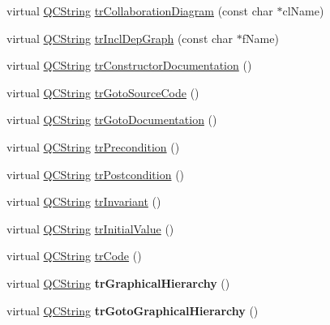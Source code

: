 \begin{DoxyCompactItemize}
\item 
virtual \hyperlink{class_q_c_string}{Q\-C\-String} \hyperlink{class_translator_swedish_ad5609f27835eb15d864cccee35b52b9d}{tr\-Collaboration\-Diagram} (const char $\ast$cl\-Name)
\item 
virtual \hyperlink{class_q_c_string}{Q\-C\-String} \hyperlink{class_translator_swedish_ac17e7ca1e68f7bb0eec49e9b1a6015af}{tr\-Incl\-Dep\-Graph} (const char $\ast$f\-Name)
\item 
virtual \hyperlink{class_q_c_string}{Q\-C\-String} \hyperlink{class_translator_swedish_ad81df771543dc5471455fde2bf0c36bb}{tr\-Constructor\-Documentation} ()
\item 
virtual \hyperlink{class_q_c_string}{Q\-C\-String} \hyperlink{class_translator_swedish_a46ba95eb7a8841df0578285a6e6a085b}{tr\-Goto\-Source\-Code} ()
\item 
virtual \hyperlink{class_q_c_string}{Q\-C\-String} \hyperlink{class_translator_swedish_a1b7438129838d73354533d168c4fb1bf}{tr\-Goto\-Documentation} ()
\item 
virtual \hyperlink{class_q_c_string}{Q\-C\-String} \hyperlink{class_translator_swedish_a338328abfdb1459810e2903dd18265d0}{tr\-Precondition} ()
\item 
virtual \hyperlink{class_q_c_string}{Q\-C\-String} \hyperlink{class_translator_swedish_abf2a58b0f4f38ff6068329a1beced84f}{tr\-Postcondition} ()
\item 
virtual \hyperlink{class_q_c_string}{Q\-C\-String} \hyperlink{class_translator_swedish_ab26b7ea104d6859adcc4d01340120e88}{tr\-Invariant} ()
\item 
virtual \hyperlink{class_q_c_string}{Q\-C\-String} \hyperlink{class_translator_swedish_a920e022240e5ed3525a79f422d00cd3e}{tr\-Initial\-Value} ()
\item 
virtual \hyperlink{class_q_c_string}{Q\-C\-String} \hyperlink{class_translator_swedish_a609c892c41043c2359060d4730a393cd}{tr\-Code} ()
\item 
\hypertarget{class_translator_swedish_a15bc6248c03a9959883a5114eca4db14}{virtual \hyperlink{class_q_c_string}{Q\-C\-String} {\bfseries tr\-Graphical\-Hierarchy} ()}\label{class_translator_swedish_a15bc6248c03a9959883a5114eca4db14}

\item 
\hypertarget{class_translator_swedish_a681c66c8a7d067c4ed547ce2175d944c}{virtual \hyperlink{class_q_c_string}{Q\-C\-String} {\bfseries tr\-Goto\-Graphical\-Hierarchy} ()}\label{class_translator_swedish_a681c66c8a7d067c4ed547ce2175d944c}


\end{DoxyCompactItemize}
